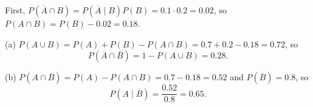 First, $P\left(\overline A\cap B\right)=P\left(\overline A\mid B\right)P(B)=0.1\cdot0.2=0.02$, so $P(A\cap B)=P(B)-0.02=0.18$.

(a) $P(A\cup B)=P(A)+P(B)-P(A\cap B)=0.7+0.2-0.18=0.72$, so
\[
P\left(\overline A\cap\overline B\right)=1-P(A\cup B)=\boxed{0.28}.
\]

(b) $P\left(A\cap\overline B\right)=P(A)-P(A\cap B)=0.7-0.18=0.52$ and $P\left(\overline B\right)=0.8$, so
\[
P\left(A\mid\overline B\right)=\dfrac{0.52}{0.8}=\boxed{0.65}.
\]
